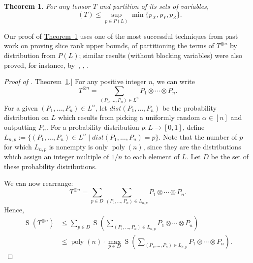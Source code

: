 \documentclass[11pt]{article}
\numberwithin{equation}{section}
\newtheorem{theorem}{Theorem}[section]
\theoremstyle{definition}
\theoremstyle{plain}
\newcommand{\expref}[2]{\hyperref[#2]{#1~\ref{#2}}}
\newcommand{\poly}{\mathop{\mathrm{poly}}}
\newcommand{\sr}{\mathop{\operatorname{S}}}
\newcommand{\tsr}{\mathop{\tilde{\operatorname{S}}}}
\theoremstyle{definition}
\begin{document}
\begin{theorem} \label{two} For any tensor $T$ and partition of its  
%
sets of variables,
$$\tsr(T) \leq \sup_{p \in P(L)} \min\{ p_X, p_Y, p_Z \}.$$
\end{theorem}

Our proof of \expref{Theorem}{two} uses one of the most successful techniques from past work on proving slice rank upper bounds, of partitioning the terms of $T^{\otimes n}$ by distribution from $P(L)$; similar results (without blocking variables) were also proved, for instance, by~\cite[Proposition~6]{tao2}, \cite[Theorem~5.2]{aw}, \cite[Theorem~5.9]{quantum}.

\begin{proof}[Proof of \expref{Theorem}{two}.]
For any positive integer $n$, we can write
$$T^{\otimes n} = \sum_{(P_1, \ldots, P_n) \in L^n} P_1 \otimes \cdots \otimes P_n.$$
For a given $(P_1, \ldots, P_n) \in L^n$, let $dist(P_1, \ldots, P_n)$ be the probability distribution on $L$ which results from picking a uniformly random $\alpha \in [n]$ and outputting $P_\alpha$. For a probability distribution $p : L \to [0,1]$, define $L_{n,p} := \{ (P_1, \ldots, P_n) \in L^n \mid dist(P_1, \ldots, P_n) = p  \}$. Note that the number of $p$ for which $L_{n,p}$ is nonempty is only $\poly(n)$, since they are the distributions which assign an integer multiple of $1/n$ to each element of $L$. Let $D$ be the set of these probability distributions.

We can now rearrange:
$$T^{\otimes n} = \sum_{p \in D} \sum_{(P_1, \ldots, P_n) \in L_{n,p}}P_1 \otimes \cdots \otimes P_n.$$
Hence,
\begin{align*}
    \sr(T^{\otimes n}) &\leq \sum_{p \in D} \sr\left( \sum_{(P_1, \ldots, P_n) \in L_{n,p}}P_1 \otimes \cdots \otimes P_n \right) \\ &\leq \poly(n) \cdot \max_{p \in D} \sr\left( \sum_{(P_1, \ldots, P_n) \in L_{n,p}}P_1 \otimes \cdots \otimes P_n \right).
\end{align*}


\end{proof}
\end{document}
